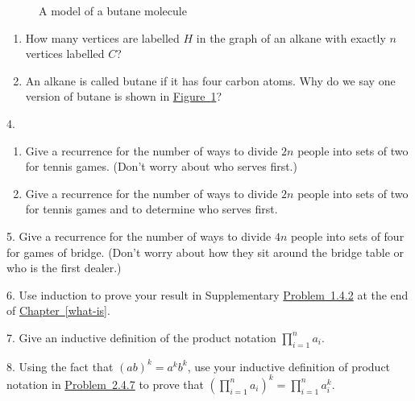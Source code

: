 \documentclass[10pt,]{book}
\theoremstyle{plain}
\theoremstyle{definition}
\theoremstyle{definition}
\numberwithin{equation}{chapter}
\newcommand{\importantarrow}{\Rightarrow}
\begin{document}
\begin{exerciselist}
\begin{figure}
{}
\caption{A model of a butane molecule\label{butane}}
\end{figure}
\leavevmode%
\begin{enumerate}[label=(\alph*)]
\item\hypertarget{li-28}{}How many vertices are labelled \(H\) in the graph of an alkane with exactly \(n\) vertices labelled \(C\)?%
\item\hypertarget{li-29}{}An alkane is called butane if it has four carbon atoms. Why do we say one version of butane is shown in \hyperref[butane]{Figure~\ref{butane}}?%
\end{enumerate}
%
\par\smallskip
\item[4.]\marginsymbol[-1em]{} \hypertarget{exercise-16}{}\leavevmode%
\begin{enumerate}[label=(\alph*)]
\item\hypertarget{li-32}{}Give a recurrence for the number of ways to divide \(2n\) people into sets of two for tennis games.  (Don't worry about who serves first.)%
\item\hypertarget{li-33}{}Give a recurrence for the number of ways to divide \(2n\) people into sets of two for tennis games and to determine who serves first.%
\end{enumerate}
%
\par\smallskip
\item[5.]\marginsymbol[-1em]{\pdftooltip{$\importantarrow$}{especially interesting}} \hypertarget{exercise-17}{}Give a recurrence for the number of ways to divide \(4n\) people into sets of four for games of bridge.  (Don't worry about how they sit around the bridge table or who is the first dealer.)%
\par\smallskip
\item[6.]\marginsymbol[-1em]{} \hypertarget{exercise-18}{}Use induction to prove your result in Supplementary \hyperlink{composition_numberof}{Problem~1.4.2} at the end of \hyperref[what-is]{Chapter~\ref{what-is}}.%
\par\smallskip
\item[7.]\marginsymbol[-1em]{} \hypertarget{inductiveprodnotation}{}Give an inductive definition of the product notation \(\displaystyle
\prod_{i=1}^n a_i\).%
\par\smallskip
\item[8.]\marginsymbol[-1em]{} \hypertarget{exercise-20}{}Using the fact that \((ab)^k =a^kb^k\), use your inductive definition of product notation in \hyperlink{inductiveprodnotation}{Problem~2.4.7} to prove that \(\displaystyle \left(\prod_{i=1}^n a_i\right)^k=\prod_{i=1}^n a_i^k\).%

\end{exerciselist}
\end{document}
